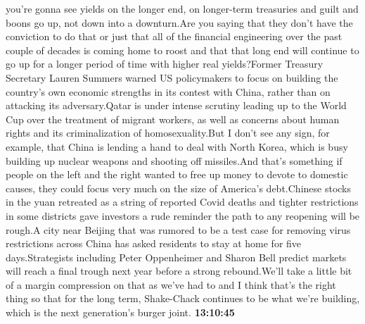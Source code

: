 \documentclass{article}%
\begin{document}
you're gonna see yields on the longer end, on longer{-}term treasuries and guilt and boons go up, not down into a downturn.Are you saying that they don't have the conviction to do that or just that all of the financial engineering over the past couple of decades is coming home to roost and that that long end will continue to go up for a longer period of time with higher real yields?Former Treasury Secretary Lauren Summers warned US policymakers to focus on building the country's own economic strengths in its contest with China, rather than on attacking its adversary.Qatar is under intense scrutiny leading up to the World Cup over the treatment of migrant workers, as well as concerns about human rights and its criminalization of homosexuality.But I don't see any sign, for example, that China is lending a hand to deal with North Korea, which is busy building up nuclear weapons and shooting off missiles.And that's something if people on the left and the right wanted to free up money to devote to domestic causes, they could focus very much on the size of America's debt.Chinese stocks in the yuan retreated as a string of reported Covid deaths and tighter restrictions in some districts gave investors a rude reminder the path to any reopening will be rough.A city near Beijing that was rumored to be a test case for removing virus restrictions across China has asked residents to stay at home for five days.Strategists including Peter Oppenheimer and Sharon Bell predict markets will reach a final trough next year before a strong rebound.We'll take a little bit of a margin compression on that as we've had to and I think that's the right thing so that for the long term, Shake{-}Chack continues to be what we're building, which is the next generation's burger joint.%
\textbf{13:10:45}%
\newline%
\end{document}
